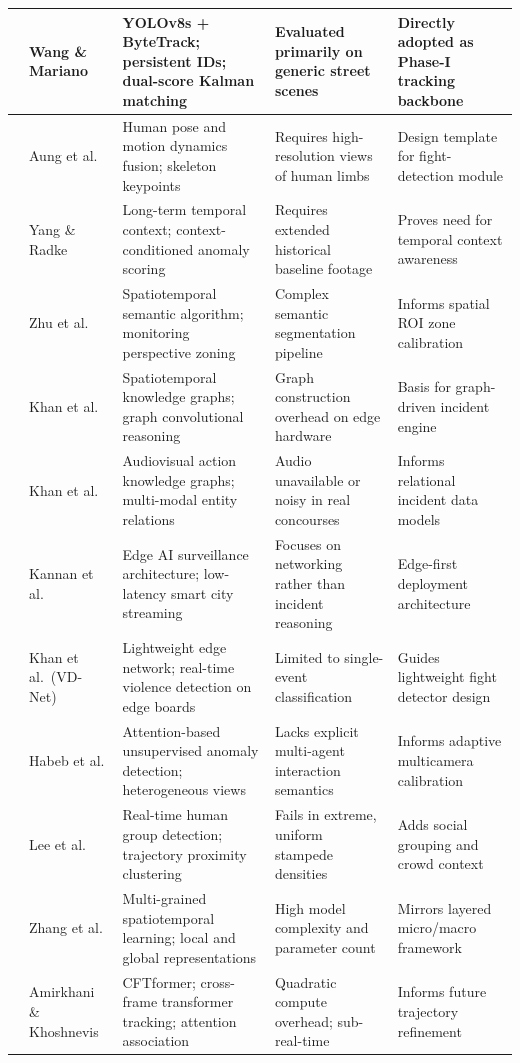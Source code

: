 \documentclass[12pt,a4paper]{report}
\begin{document}
\begin{table}[H]
\begin{tabular}{|c|p{3.2cm}|p{3.8cm}|p{3.8cm}|p{3.2cm}|}
\cite{p7} & Wang \& Mariano & YOLOv8s + ByteTrack; persistent IDs; dual-score Kalman matching & Evaluated primarily on generic street scenes & Directly adopted as Phase-I tracking backbone \\ \hline
\cite{p8} & Aung et al. & Human pose and motion dynamics fusion; skeleton keypoints & Requires high-resolution views of human limbs & Design template for fight-detection module \\ \hline
\cite{p9} & Yang \& Radke & Long-term temporal context; context-conditioned anomaly scoring & Requires extended historical baseline footage & Proves need for temporal context awareness \\ \hline
\cite{p10} & Zhu et al. & Spatiotemporal semantic algorithm; monitoring perspective zoning & Complex semantic segmentation pipeline & Informs spatial ROI zone calibration \\ \hline
\cite{p11} & Khan et al. & Spatiotemporal knowledge graphs; graph convolutional reasoning & Graph construction overhead on edge hardware & Basis for graph-driven incident engine \\ \hline
\cite{p12} & Khan et al. & Audiovisual action knowledge graphs; multi-modal entity relations & Audio unavailable or noisy in real concourses & Informs relational incident data models \\ \hline
\cite{p13} & Kannan et al. & Edge AI surveillance architecture; low-latency smart city streaming & Focuses on networking rather than incident reasoning & Edge-first deployment architecture \\ \hline
\cite{p14} & Khan et al.\ (VD-Net) & Lightweight edge network; real-time violence detection on edge boards & Limited to single-event classification & Guides lightweight fight detector design \\ \hline
\cite{p15} & Habeb et al. & Attention-based unsupervised anomaly detection; heterogeneous views & Lacks explicit multi-agent interaction semantics & Informs adaptive multicamera calibration \\ \hline
\cite{p16} & Lee et al. & Real-time human group detection; trajectory proximity clustering & Fails in extreme, uniform stampede densities & Adds social grouping and crowd context \\ \hline
\cite{p17} & Zhang et al. & Multi-grained spatiotemporal learning; local and global representations & High model complexity and parameter count & Mirrors layered micro/macro framework \\ \hline
\cite{p18} & Amirkhani \& Khoshnevis & CFTformer; cross-frame transformer tracking; attention association & Quadratic compute overhead; sub-real-time & Informs future trajectory refinement \\ \hline

\end{tabular}
\end{table}
\end{document}
